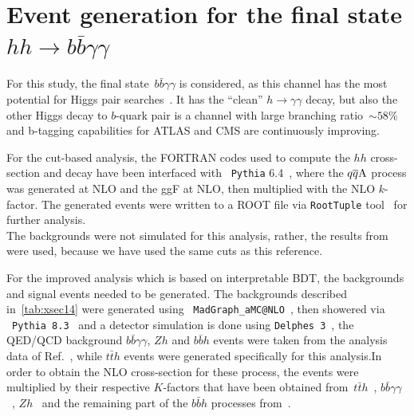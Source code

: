 \section{Event generation for the final state $ hh \to b \bar b \gamma \gamma$ \label{sec:evnt}}
For this study,  the final state~$b \bar{b} \gamma \gamma$ is considered, as this channel has the most potential for Higgs pair searches~\cite{Cepeda:2019klc}. It has the ``clean'' $h \to \gamma \gamma$ decay, but also the other Higgs decay to $b$-quark pair is a channel with large branching ratio~$\sim 58\%$ and b-tagging capabilities for ATLAS and CMS are continuously improving. \\
\par 
For the cut-based analysis, the FORTRAN codes used to compute the $hh$ cross-section and decay have been interfaced with ~\texttt{Pythia} 6.4~\cite{Sjostrand:2006za}, where the $q\overline q \rm A$ process was generated at NLO and the ggF at NLO, then multiplied with the NLO $k$-factor. The generated events were written to a ROOT file via \texttt{RootTuple} tool~\cite{roottuple} for further analysis. \\ The backgrounds were not simulated for this analysis, rather, the results from ~\cite{Azatov:2015oxa} were used, because we have used the same cuts as this reference.
\par 
For the improved analysis which is based on interpretable BDT, the backgrounds and signal events needed to be generated. The backgrounds described in~\autoref{tab:xsec14} were generated using~ \texttt{MadGraph\_aMC@NLO}~\cite{Alwall:2014hca}, then showered via ~\texttt{Pythia 8.3}~\cite{Sjostrand:2014zea} and a detector simulation is done using \texttt{Delphes 3}~\cite{deFavereau:2013fsa}, the QED/QCD background $ b \bar b\gamma \gamma$, $Zh$  and $ b \bar b h$ events were taken from the analysis data of Ref.~\cite{Grojean:2020ech}, while $t \bar t h $ events were generated specifically for this analysis.In order to obtain the NLO cross-section for these process, the events were multiplied by their respective $K$-factors that have been obtained from~$t\bar{t}h$~\cite{Beenakker:2001rj}, $b\bar b \gamma\gamma$~\cite{Fah:2017wlf}, $Zh$~\cite{Campanario:2014lza} and the remaining part of the $b\bar bh$ processes from~\cite{Dawson:2005vi}. \\ 

